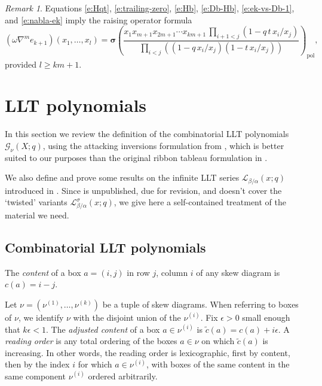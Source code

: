\documentclass[12pt]{amsart}
\theoremstyle{definition}
\theoremstyle{remark}
\newtheorem{remark}[thm]{Remark}
\newcommand{\sigmabold}{{\boldsymbol \sigma }}
\newcommand{\Gcal}{{\mathcal G}}
\newcommand{\Lcal}{{\mathcal L}}
\newcommand{\ctild}{\tilde{c}}
\DeclareMathOperator{\pol}{pol}
\begin{document}
\begin{remark}\label{rem:nabla-formula}
Equations \eqref{e:Hqt}, \eqref{e:trailing-zero}, \eqref{e:Hb},
\eqref{e:Db-Hb}, \eqref{e:ek-vs-Db-1}, and \eqref{e:nabla-ek} imply
the raising operator formula
\begin{equation}\label{e:nabla-formula}
(\omega\nabla^m e_{k+1})(x_1,\dots,x_l) = \sigmabold \left(\frac{x_1
x_{m+1} x_{2m+1}\cdots x_{km+1} \, \prod _{i+1<j} (1 - q\, t\,
x_{i}/x_{j})}{\prod _{i<j} ((1 - q\, x_{i}/x_{j}) (1 -
t\,x_{i}/x_{j}))} \right)_{\pol},
\end{equation}
provided $l \geq km+1$.
\end{remark}


\section{LLT polynomials} \label{s:LLT}

In this section we review the definition of the combinatorial LLT
polynomials $\Gcal _{\nu }(X;q)$, using the attacking inversions
formulation from \cite{HaHaLoReUl05}, which is better suited to our
purposes than the original ribbon tableau formulation in
\cite{LaLeTh97}.

We also define and prove some results on the infinite LLT series
$\Lcal _{\beta /\alpha }(x;q)$ introduced in \cite{GrojHaim07}.  Since
\cite{GrojHaim07} is unpublished, due for revision, and doesn't cover
the `twisted' variants $\Lcal ^{\sigma }_{\beta /\alpha }(x;q)$, we
give here a self-contained treatment of the material we need.

\subsection{Combinatorial LLT polynomials}
\label{ss:G-nu}

The {\em content} of a box $a=(i,j)$ in row $j$, column $i$ of any
skew 
diagram is $c(a)=i-j$.

Let $\nu = (\nu ^{(1)},\ldots,\nu ^{(k)})$ be a tuple of skew
diagrams.  When referring to boxes of $\nu $, we identify $\nu $ with
the disjoint union of the $\nu ^{(i)}$.  Fix $\epsilon >0$ small
enough that $k\epsilon <1$.  The {\em adjusted content} of a box $a\in
\nu ^{(i)}$ is $\ctild (a) = c(a)+i\epsilon $.  A {\em reading order}
is any total ordering of the boxes $a\in \nu $ on which $\ctild (a)$
is increasing.  In other words, the reading order is lexicographic,
first by content, then by the index $i$ for which $a\in \nu ^{(i)}$,
with boxes of the same content in the same component $\nu ^{(i)}$
ordered arbitrarily.
\end{document}
